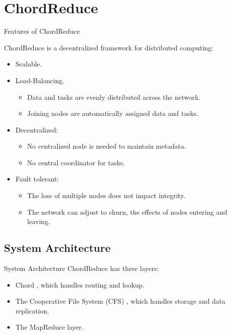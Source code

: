 \documentclass[11pt]{beamer}
\begin{document}
\section{ChordReduce}


\begin{frame}{Features of ChordReduce}

ChordReduce is a decentralized framework for distributed computing:
\begin{itemize}
	\item Scalable.
	\item Load-Balancing.
	\begin{itemize}
		\item Data and tasks are evenly distributed across the network.
		\item Joining nodes are automatically assigned data and tasks.
	\end{itemize}
	
	\item Decentralized:
	\begin{itemize}
		\item No centralized node is needed to maintain metadata.
		\item No central coordinator for tasks.
	\end{itemize}
	\item Fault tolerant:
	\begin{itemize}
		\item The loss of multiple nodes does not impact integrity.
		\item The network can adjust to churn, the effects of nodes entering and leaving.
	\end{itemize}
	
\end{itemize}

\end{frame}



\subsection{System Architecture}
\begin{frame}{System Architecture}
ChordReduce has three layers:
\begin{itemize}
	\item Chord \cite{Chord}, which handles routing and lookup.
	\item The Cooperative File System (CFS) \cite{CFS}, which handles storage and data replication.
	\item The MapReduce layer.
\end{itemize}

\end{frame}
\end{document}
